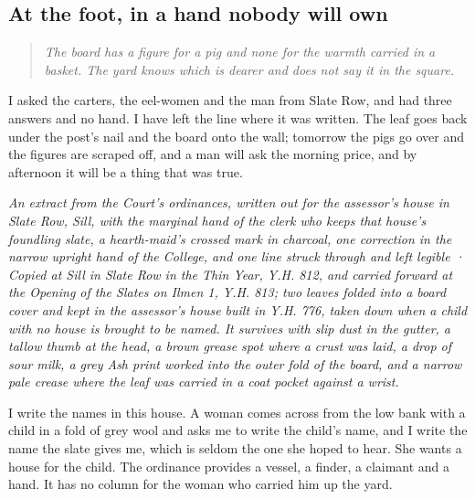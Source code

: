 \documentclass{design/chronicle}
\begin{document}
\subsection*{At the foot, in a hand nobody will own}

\begin{quote}\itshape The board has a figure for a pig and none for the warmth carried in a basket. The yard knows which is dearer and does not say it in the square.\end{quote}

I asked the carters, the eel-women and the man from Slate Row, and had three answers and no hand. I have left the line where it was written. The leaf goes back under the post’s nail and the board onto the wall; tomorrow the pigs go over and the figures are scraped off, and a man will ask the morning price, and by afternoon it will be a thing that was true.

\clearpage{}
{\centering\FellFont\itshape\footnotesize\color{faded} An extract from the Court’s ordinances, written out for the assessor’s house in Slate Row, Sill, with the marginal hand of the clerk who keeps that house’s foundling slate, a hearth-maid’s crossed mark in charcoal, one correction in the narrow upright hand of the College, and one line struck through and left legible · Copied at Sill in Slate Row in the Thin Year, Y.H. 812, and carried forward at the Opening of the Slates on Ilmen 1, Y.H. 813; two leaves folded into a board cover and kept in the assessor’s house built in Y.H. 776, taken down when a child with no house is brought to be named. It survives with slip dust in the gutter, a tallow thumb at the head, a brown grease spot where a crust was laid, a drop of sour milk, a grey Ash print worked into the outer fold of the board, and a narrow pale crease where the leaf was carried in a coat pocket against a wrist.\par}\medskip
I write the names in this house. A woman comes across from the low bank with a child in a fold of grey wool and asks me to write the child’s name, and I write the name the slate gives me, which is seldom the one she hoped to hear. She wants a house for the child. The ordinance provides a vessel, a finder, a claimant and a hand. It has no column for the woman who carried him up the yard.
\end{document}
